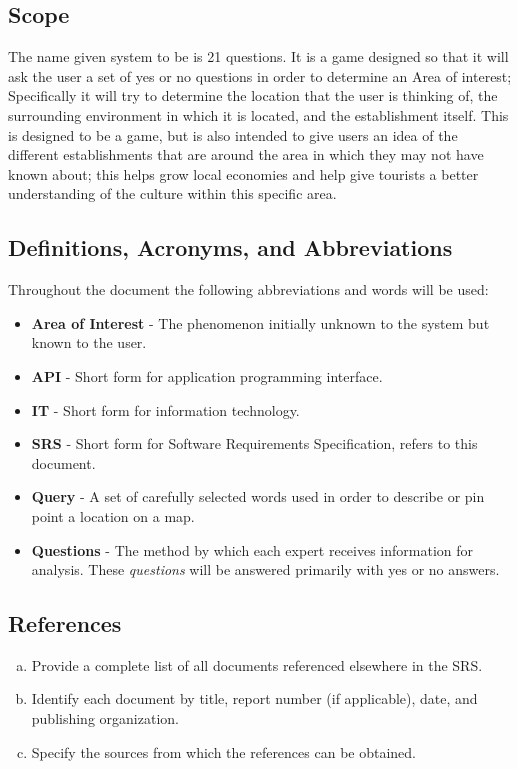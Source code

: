 \documentclass[titlepage]{article}
\begin{document}
		
		\subsection{Scope}
		\label{sub:scope}
		
		The name given system to be is 21 questions. It is a game designed so that it will ask the user a set of yes or no questions in order to determine an Area of interest; Specifically it will try to determine the location that the user is thinking of, the surrounding environment in which it is located, and the establishment itself. This is designed to be a game, but is also intended to give users an idea of the different establishments that are around the area in which they may not have known about; this helps grow local economies and help give tourists a better understanding of the culture within this specific area. 
				
		\subsection{Definitions, Acronyms, and Abbreviations}
		\label{sub:definitions_acronyms_and_abbreviations}
		Throughout  the document the following abbreviations and words will be used:
		\begin{itemize}
			\item \textbf{Area of Interest} - The phenomenon initially unknown to the system but known to the user.
			\item \textbf{API} - Short form for application programming interface.
			\item \textbf{IT} - Short form for information technology.
			\item \textbf{SRS} - Short form for Software Requirements Specification, refers to this document.
			\item \textbf{Query} - A set of carefully selected words used in order to describe or pin point a location on a map.
			\item \textbf{Questions} - The method by which each expert receives information for analysis. These \textit{questions} will be answered primarily with yes or no answers.
			
		\end{itemize}
		
		\subsection{References}
		\label{sub:references}
		\begin{enumerate}[a)]
			\item Provide a complete list of all documents referenced elsewhere in the SRS.
			\item Identify each document by title, report number (if applicable), date, and publishing organization.
			\item Specify the sources from which the references can be obtained.
		\end{enumerate}
		
\end{document}

